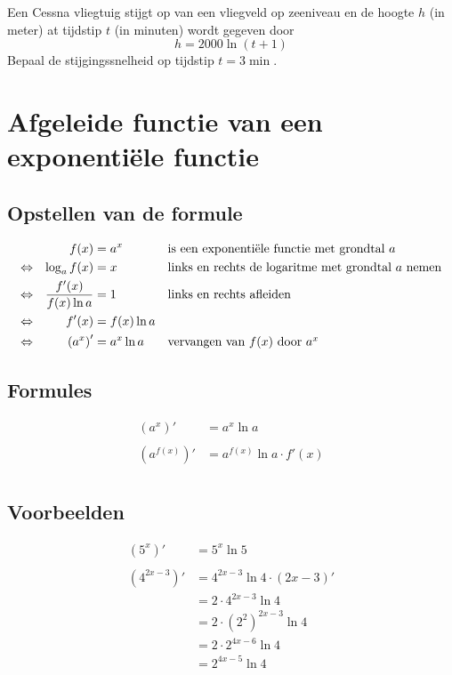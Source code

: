 \documentclass[12pt]{article}
\begin{document}
\begin{oefening}
Een Cessna vliegtuig stijgt op van een vliegveld op zeeniveau en de hoogte $h$ (in meter) at tijdstip $t$ (in minuten) wordt gegeven door
$$h=2000 \ln(t+1)$$
Bepaal de stijgingssnelheid op tijdstip $t=3\min$.
\end{oefening}
\vspace*{-1cm}

\pagebreak
\section{Afgeleide functie van een exponentiële functie}

\subsection{Opstellen van de formule}

\begin{align*}
       && f(x) &= a^x && \mbox{is een exponentiële functie met grondtal $a$}\\
  \Leftrightarrow && \log_a f(x) &= x && \mbox{links en rechts de logaritme met grondtal $a$ nemen}\\
  \Leftrightarrow && \dfrac{f'(x)}{f(x)\ln a} &= 1 && \mbox{links en rechts afleiden}\\
  \Leftrightarrow && f'(x) &= f(x)\ln a\\
  \Leftrightarrow && \left(a^x\right)' &= a^x \ln a && \mbox{vervangen van $f(x)$ door $a^x$}
\end{align*}

\subsection{Formules}

\begin{align*}
  \left(a^x\right)' &= a^x \ln a\\\\
  \left(a^{f(x)}\right)' &= a^{f(x)} \ln a \cdot f'(x)\\
\end{align*}

\subsection{Voorbeelden}

\begin{align*}
\left(5^x\right)'      &= 5^x \ln 5\\\\
\left(4^{2x-3}\right)' &= 4^{2x-3} \ln 4 \cdot (2x-3)'\\
                       &= 2 \cdot 4^{2x-3} \ln 4\\
                       &= 2 \cdot \left(2^2\right)^{2x-3} \ln 4\\
                       &= 2 \cdot 2^{4x-6} \ln 4\\
                       &= 2^{4x-5} \ln 4\\
\end{align*}
\end{document}
